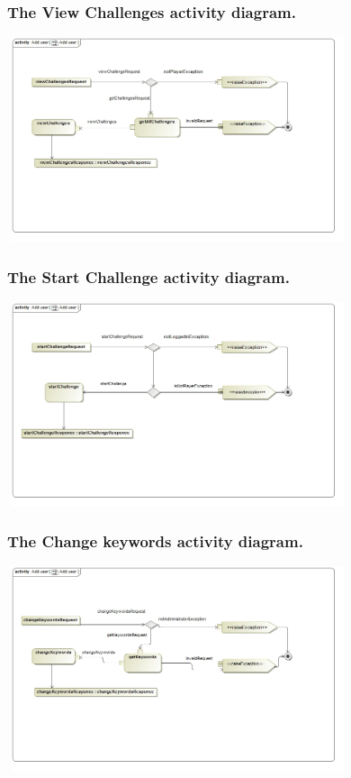\documentclass[english]{article}
\begin{document}
		 \subsubsection* {The View Challenges activity diagram.}
		 \includegraphics[width=10cm,height=6cm,keepaspectratio]{ViewChallenges.jpg}
		 
		  \subsubsection* {The Start Challenge activity diagram.}
		  \includegraphics[width=10cm,height=6cm,keepaspectratio]{StartChallenge1.jpg}
		  
		   \subsubsection* {The Change keywords activity diagram.}
		   \includegraphics[width=10cm,height=6cm,keepaspectratio]{ChangeKeywords.jpg}
		 
\end{document}
